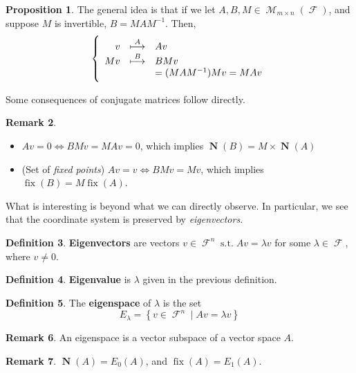 \documentclass[11pt]{amsart} %
\theoremstyle{definition}
\newtheorem{definition}{Definition}[section]
\newtheorem{proposition}[definition]{Proposition}
\theoremstyle{definition}
\newtheorem{remark}[definition]{Remark}
\DeclareMathOperator{\FF}{\mathcal{F}}
\DeclareMathOperator{\suchthat}{\text{ s.t. }}
\DeclareMathOperator{\Ma}{\mathcal{M}}
\DeclareMathOperator{\NA}{\mathbf{N}}
\DeclareMathOperator{\fix}{fix}
\numberwithin{equation}{section}
\begin{document}
\begin{proposition}
	The general idea is that if we let $A,B,M \in \Ma_{m \times n } (\FF)$, and suppose $M$ is invertible, $B=MAM^{-1}$. Then,
	$$ \left\{ \begin{array}{r c l}
	v & \overset{ A }{\longmapsto } & Av \\
	Mv & \overset{ B }{\longmapsto } & BMv  \\
	& & =  (MAM^{-1}) Mv = MAv \\
	\end{array} \right. $$
\end{proposition}

Some consequences of conjugate matrices follow directly.

\begin{remark}
\begin{itemize}%
	\item $Av = 0 \iff BMv = MAv = 0$, which implies $\NA (B) = M \times \NA (A)$
	\item (Set of \textit{fixed points}) $Av = v \iff BMv = Mv$, which implies $\fix (B) = M \fix (A)$.
\end{itemize}
\end{remark}

What is interesting is beyond what we can directly observe. In particular, we see that the coordinate system is preserved by \textit{eigenvectors}. 

\begin{definition}
	\textbf{Eigenvectors} are vectors $v \in \FF^n \suchthat Av = \lambda v$ for some $\lambda \in \FF$, where $v \neq 0$.
\end{definition}

\begin{definition}
	\textbf{Eigenvalue} is $\lambda$ given in the previous definition.
\end{definition}

\begin{definition}
	The \textbf{eigenspace} of $\lambda$ is the set
	$$ E_{\lambda} = \left\{ v \in \FF^n \mid Av = \lambda v \right\} $$
\end{definition}

\begin{remark}
	An eigenspace is a vector subspace of a vector space $A$.
\end{remark}

\begin{remark}
	$\NA (A) = E_{0} (A)$, and $\fix (A) = E_{1} (A)$.
\end{remark}
\end{document}
